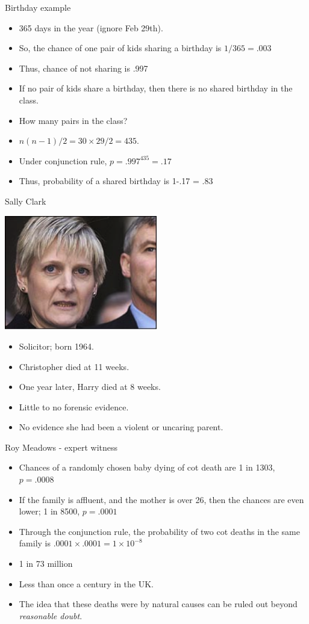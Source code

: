 \documentclass{beamer}
\begin{document}
\begin{frame}{Birthday example}
	\begin{itemize} 
		\item 365 days in the year (ignore Feb 29th).
		\item So, the chance of one pair of kids sharing a birthday is $1/365 = .003$
		\item Thus, chance of not sharing is .997
		\item If no pair of kids share a birthday, then there is no shared birthday in the class.
		\item How many pairs in the class?
		\item $n(n-1)/2 = 30 \times 29/2 = 435$.	
		\item Under conjunction rule, $p = .997^{435} = .17$
		\item Thus, probability of a shared birthday is 1-.17 = .83	
	\end{itemize}
\end{frame}

\begin{frame}{Sally Clark}
\centerline{\includegraphics[width=0.5\textwidth]{pics/sallyclark.png}}
\begin{itemize}
\item Solicitor; born 1964.
\item Christopher died at 11 weeks.
\item One year later, Harry died at 8 weeks.
\item Little to no forensic evidence.
\item No evidence she had been a violent or uncaring parent.
\end{itemize}
\end{frame}

\begin{frame}{Roy Meadows - expert witness}
\begin{itemize}
\item Chances of a randomly chosen baby dying of cot death are 1 in 1303, $p = .0008$
\item If the family is affluent, and the mother is over 26, then the chances are even lower; 1 in 8500, $p = .0001$
\item Through the conjunction rule, the probability of two cot deaths in the same family is $ .0001 \times .0001 = 1 \times 10^{-8}$
\item 1 in 73 million
\item Less than once a century in the UK.
\item The idea that these deaths were by natural causes can be ruled out beyond \emph{reasonable doubt}.
\end{itemize}
\end{frame}
\end{document}
